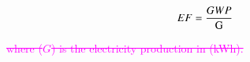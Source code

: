 \begin{description}
\begin{equation}
EF=\frac{GWP}{\mathrm{G}}   
\tagaddtext{[$\frac{kg CO_{2-eq}}{kWh}$]}
\label{eq:EFold}
\end{equation}

\textcolor{magenta}{\sout{ where ($G$) is the electricity production in (kWh).}}



\end{description}

